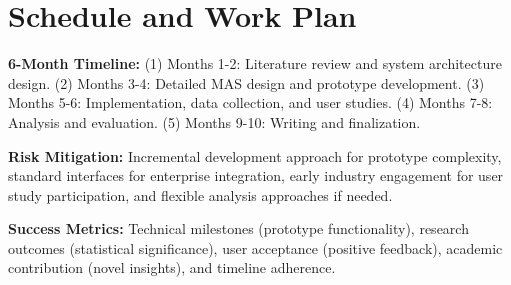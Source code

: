 
\chapter{Schedule and Work Plan}\label{chapter:schedule}

\textbf{6-Month Timeline:} (1) Months 1-2: Literature review and system architecture design. (2) Months 3-4: Detailed MAS design and prototype development. (3) Months 5-6: Implementation, data collection, and user studies. (4) Months 7-8: Analysis and evaluation. (5) Months 9-10: Writing and finalization.

\textbf{Risk Mitigation:} Incremental development approach for prototype complexity, standard interfaces for enterprise integration, early industry engagement for user study participation, and flexible analysis approaches if needed.

\textbf{Success Metrics:} Technical milestones (prototype functionality), research outcomes (statistical significance), user acceptance (positive feedback), academic contribution (novel insights), and timeline adherence.
